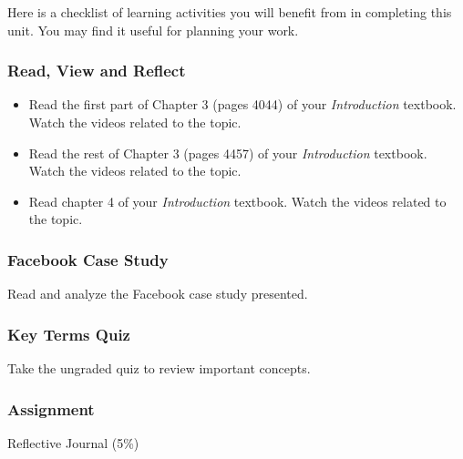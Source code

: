 \documentclass[
]{book}
\providecommand{\tightlist}{%
  \setlength{\itemsep}{0pt}\setlength{\parskip}{0pt}}
\begin{document}
Here is a checklist of learning activities you will benefit from in completing
this unit. You may find it useful for planning your work.

\begin{reflect}
\hypertarget{read-view-and-reflect-2}{%
\subsubsection*{Read, View and Reflect}\label{read-view-and-reflect-2}}

\begin{itemize}
\tightlist
\item
  Read the first part of Chapter 3 (pages 4044) of your \emph{Introduction} textbook. Watch the videos related to the topic.
\item
  Read the rest of Chapter 3 (pages 4457) of your \emph{Introduction} textbook. Watch the videos related to the topic.
\item
  Read chapter 4 of your \emph{Introduction} textbook. Watch the videos related to the topic.
\end{itemize}

\hypertarget{facebook-case-study}{%
\subsubsection*{Facebook Case Study}\label{facebook-case-study}}

Read and analyze the Facebook case study presented.

\hypertarget{key-terms-quiz}{%
\subsubsection*{Key Terms Quiz}\label{key-terms-quiz}}

Take the ungraded quiz to review important concepts.

\hypertarget{assignment-1}{%
\subsubsection*{\texorpdfstring{\textbf{Assignment}}{Assignment}}\label{assignment-1}}

Reflective Journal (5\%)
\end{reflect}
\end{document}
